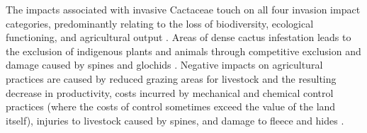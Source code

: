 The impacts associated with invasive Cactaceae touch on all four invasion impact categories, predominantly relating to the loss of biodiversity, ecological functioning, and agricultural output \citep{kaplan2017proposed, novoa2019spinelessness}. Areas of dense cactus infestation leads to the exclusion of indigenous plants and animals through competitive exclusion and damage caused by spines and glochids \citep{walters2011}. Negative impacts on agricultural practices are caused by reduced grazing areas for livestock and the resulting decrease in productivity, costs incurred by mechanical and chemical control practices (where the costs of control sometimes exceed the value of the land itself), injuries to livestock caused by spines, and damage to fleece and hides \citep{Lloyd2014}. 